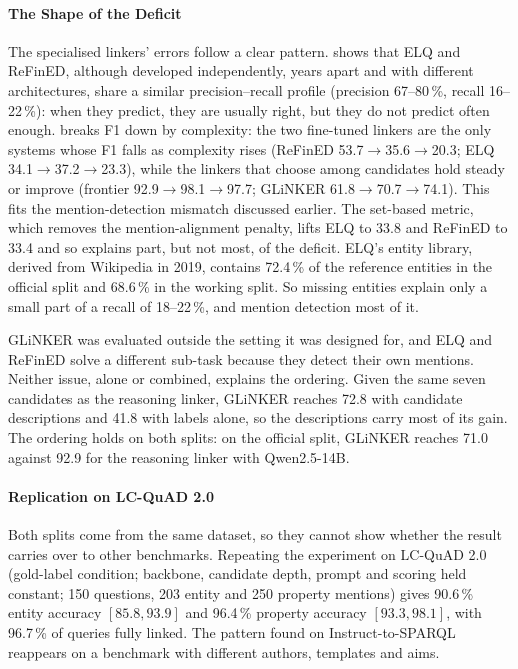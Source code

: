 \paragraph{The Shape of the Deficit}

The specialised linkers' errors follow a clear pattern.
 shows that ELQ and ReFinED, although developed independently, years apart and with different architectures, share a similar precision–recall profile (precision 67--80\,\%, recall 16--22\,\%): when they predict, they are usually right, but they do not predict often enough.
 breaks F1 down by complexity: the two fine-tuned linkers are the only systems whose F1 falls as complexity rises (ReFinED 53.7$\to$35.6$\to$20.3; ELQ 34.1$\to$37.2$\to$23.3), while the linkers that choose among candidates hold steady or improve (frontier 92.9$\to$98.1$\to$97.7; GLiNKER 61.8$\to$70.7$\to$74.1).
This fits the mention-detection mismatch discussed earlier.
The set-based metric, which removes the mention-alignment penalty, lifts ELQ to 33.8 and ReFinED to 33.4 and so explains part, but not most, of the deficit.
ELQ's entity library, derived from Wikipedia in 2019, contains 72.4\,\% of the reference entities in the official split and 68.6\,\% in the working split.
So missing entities explain only a small part of a recall of 18--22\,\%, and mention detection most of it.

GLiNKER was evaluated outside the setting it was designed for, and ELQ and ReFinED solve a different sub-task because they detect their own mentions.
Neither issue, alone or combined, explains the ordering.
Given the same seven candidates as the reasoning linker, GLiNKER reaches 72.8 with candidate descriptions and 41.8 with labels alone, so the descriptions carry most of its gain.
The ordering holds on both splits: on the official split, GLiNKER reaches 71.0 against 92.9 for the reasoning linker with Qwen2.5-14B.

\paragraph{Replication on LC-QuAD 2.0}

Both splits come from the same dataset, so they cannot show whether the result carries over to other benchmarks.
Repeating the experiment on LC-QuAD 2.0 (gold-label condition; backbone, candidate depth, prompt and scoring held constant; 150 questions, 203 entity and 250 property mentions) gives 90.6\,\% entity accuracy $[85.8, 93.9]$ and 96.4\,\% property accuracy $[93.3, 98.1]$, with 96.7\,\% of queries fully linked.
The pattern found on Instruct-to-SPARQL reappears on a benchmark with different authors, templates and aims.

